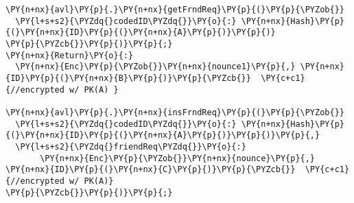 \begin{Verbatim}[commandchars=\\\{\},codes={\catcode`\$=3\catcode`\^=7\catcode`\_=8}]
\PY{n+nx}{avl}\PY{p}{.}\PY{n+nx}{getFrndReq}\PY{p}{(}\PY{p}{\PYZob{}}
  \PY{l+s+s2}{\PYZdq{}codedID\PYZdq{}}\PY{o}{:} \PY{n+nx}{Hash}\PY{p}{(}\PY{n+nx}{ID}\PY{p}{(}\PY{n+nx}{A}\PY{p}{)}\PY{p}{)}
\PY{p}{\PYZcb{}}\PY{p}{)}\PY{p}{;}
\PY{n+nx}{Return}\PY{o}{:}
  \PY{n+nx}{Enc}\PY{p}{\PYZob{}}\PY{n+nx}{nounce1}\PY{p}{,} \PY{n+nx}{ID}\PY{p}{(}\PY{n+nx}{B}\PY{p}{)}\PY{p}{\PYZcb{}}  \PY{c+c1}{//encrypted w/ PK(A) }

\PY{n+nx}{avl}\PY{p}{.}\PY{n+nx}{insFrndReq}\PY{p}{(}\PY{p}{\PYZob{}}
  \PY{l+s+s2}{\PYZdq{}codedID\PYZdq{}}\PY{o}{:} \PY{n+nx}{Hash}\PY{p}{(}\PY{n+nx}{ID}\PY{p}{(}\PY{n+nx}{A}\PY{p}{)}\PY{p}{)}\PY{p}{,}
  \PY{l+s+s2}{\PYZdq{}friendReq\PYZdq{}}\PY{o}{:} 
       \PY{n+nx}{Enc}\PY{p}{\PYZob{}}\PY{n+nx}{nounce}\PY{p}{,} \PY{n+nx}{ID}\PY{p}{(}\PY{n+nx}{C}\PY{p}{)}\PY{p}{\PYZcb{}}  \PY{c+c1}{//encrypted w/ PK(A)}
\PY{p}{\PYZcb{}}\PY{p}{)}\PY{p}{;}
\end{Verbatim}
